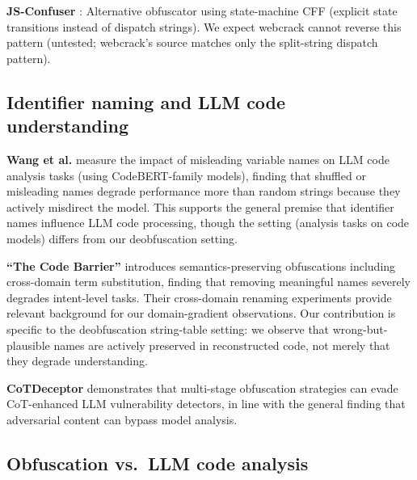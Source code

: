 \documentclass[11pt]{article}
\begin{document}
\textbf{JS-Confuser} \cite{jsconfuser}: Alternative obfuscator using state-machine CFF
(explicit state transitions instead of dispatch strings). We expect
webcrack cannot reverse this pattern (untested; webcrack's source
matches only the split-string dispatch pattern).

\subsection{Identifier naming and LLM code understanding}

\textbf{Wang et al.} \cite{wang2024} measure the impact of misleading variable names
on LLM code analysis tasks (using CodeBERT-family models), finding
that shuffled or misleading names degrade performance more than
random strings because they actively misdirect the model. This
supports the general premise that identifier names influence LLM
code processing, though the setting (analysis tasks on code models)
differs from our deobfuscation setting.

\textbf{``The Code Barrier''} \cite{codebarrier} introduces semantics-preserving
obfuscations including cross-domain term substitution, finding that
removing meaningful names severely degrades intent-level tasks.
Their cross-domain renaming experiments provide relevant background
for our domain-gradient observations. Our contribution is specific
to the deobfuscation string-table setting: we observe that
wrong-but-plausible names are actively preserved in reconstructed
code, not merely that they degrade understanding.

\textbf{CoTDeceptor} \cite{cotdeceptor} demonstrates that multi-stage obfuscation
strategies can evade CoT-enhanced LLM vulnerability detectors,
in line with the general finding that adversarial content can
bypass model analysis.

\subsection{Obfuscation vs.\ LLM code analysis}
\end{document}
